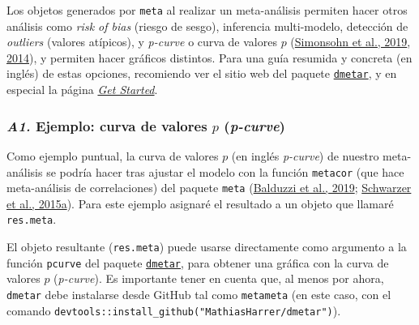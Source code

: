 \documentclass[
  bookmarksnumbered]{article}
\newenvironment{Shaded}{\begin{snugshade}}{\end{snugshade}}
\newcommand{\AttributeTok}[1]{\textcolor[rgb]{0.00,0.34,0.68}{#1}}
\newcommand{\FunctionTok}[1]{\textcolor[rgb]{0.39,0.29,0.61}{#1}}
\newcommand{\NormalTok}[1]{\textcolor[rgb]{0.12,0.11,0.11}{#1}}
\newcommand{\OtherTok}[1]{\textcolor[rgb]{0.00,0.43,0.16}{#1}}
\newcommand{\SpecialCharTok}[1]{\textcolor[rgb]{0.24,0.68,0.91}{#1}}
\newcommand{\StringTok}[1]{\textcolor[rgb]{0.75,0.01,0.01}{#1}}
\begin{document}
Los objetos generados por \texttt{meta} al realizar un meta-análisis permiten hacer otros análisis como \emph{risk of bias} (riesgo de sesgo), inferencia multi-modelo, detección de \emph{outliers} (valores atípicos), y \emph{p-curve} o curva de valores \(p\) (\protect\hyperlink{ref-simonsohnPcurveWonYour2019}{Simonsohn et al., 2019}, \protect\hyperlink{ref-simonsohnPCurveEffectSize2014}{2014}), y permiten hacer gráficos distintos. Para una guía resumida y concreta (en inglés) de estas opciones, recomiendo ver el sitio web del paquete \href{http://dmetar.protectlab.org/}{\texttt{dmetar}}, y en especial la página \href{https://dmetar.protectlab.org/articles/dmetar.html}{\emph{Get Started}}.

\hypertarget{p-curve}{%
\subsubsection*{\texorpdfstring{\emph{A1.} Ejemplo: curva de valores \(p\) (\emph{p-curve})}{A1. Ejemplo: curva de valores p (p-curve)}}\label{p-curve}}

Como ejemplo puntual, la curva de valores \(p\) (en inglés \emph{p-curve}) de nuestro meta-análisis se podría hacer tras ajustar el modelo con la función \texttt{metacor} (que hace meta-análisis de correlaciones) del paquete \texttt{meta} (\protect\hyperlink{ref-BalduzziMeta2019}{Balduzzi et al., 2019}; \protect\hyperlink{ref-schwarzerMetaAnalysis2015}{Schwarzer et al., 2015a}). Para este ejemplo asignaré el resultado a un objeto que llamaré \texttt{res.meta}.

\begin{Shaded}
\end{Shaded}

El objeto resultante (\texttt{res.meta}) puede usarse directamente como argumento a la función \texttt{pcurve} del paquete \href{http://dmetar.protectlab.org/}{\texttt{dmetar}}, para obtener una gráfica con la curva de valores \(p\) (\emph{p-curve}). Es importante tener en cuenta que, al menos por ahora, \texttt{dmetar} debe instalarse desde GitHub tal como \texttt{metameta} (en este caso, con el comando \texttt{devtools::install\_github("MathiasHarrer/dmetar")}).
\end{document}

